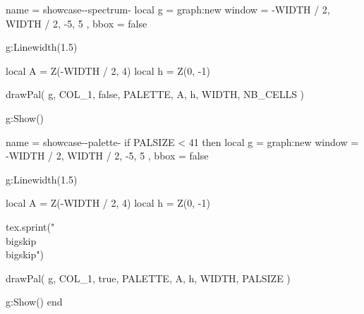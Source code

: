 \begin{luadraw}{name = showcase-\STYLE-spectrum-\PALETTE}
local g = graph:new{
  window = {
    -WIDTH / 2,
    WIDTH / 2,
    -5, 5
  },
  bbox = false
}

g:Linewidth(1.5)

local A = Z(-WIDTH / 2, 4)
local h = Z(0, -1)

drawPal(
  g,
  COL_1, false,
  PALETTE,
  A,
  h, WIDTH,
  NB_CELLS
)

g:Show()
\end{luadraw}



\begin{luadraw}{name = showcase-\STYLE-palette-\PALETTE}
if PALSIZE < 41 then
  local g = graph:new{
    window = {
      -WIDTH / 2,
      WIDTH / 2,
      -5, 5
    },
    bbox = false
  }

  g:Linewidth(1.5)

  local A = Z(-WIDTH / 2, 4)
  local h = Z(0, -1)

  tex.sprint("\\bigskip\\bigskip")

  drawPal(
    g,
    COL_1, true,
    PALETTE,
    A,
    h, WIDTH,
    PALSIZE
  )

  g:Show()
end
\end{luadraw}
